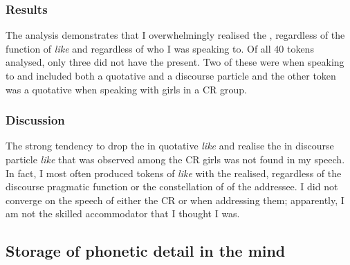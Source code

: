 \subsubsection{Results}
The analysis demonstrates that I overwhelmingly realised the , regardless of the function of \textit{like} and regardless of who I was speaking to. Of all 40 tokens analysed, only three did not have the  present. Two of these were when speaking to  and included both a quotative and a discourse particle and the other token was a quotative when speaking with girls in a CR group. 

\subsubsection{Discussion}
The strong tendency to drop the  in quotative \textit{like} and realise the  in discourse particle \textit{like} that was observed among the CR girls was not found in my speech. In fact, I most often produced tokens of \textit{like} with the  realised, regardless of the discourse pragmatic function or the constellation of  of the addressee. I did not converge on the speech of either the CR or  when addressing them; apparently, I am not the skilled accommodator that I thought I was. 



\subsection{Storage of phonetic detail in the mind}




